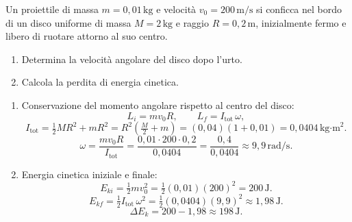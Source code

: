 \begin{question}[ID=3.3, subtitle={Proiettile che si conficca nel bordo di un disco rotante}, tags={urti anelastici, momento angolare}, difficulty=difficile]
Un proiettile di massa \(m = 0{,}01 \, \text{kg}\) e velocità \(v_0 = 200 \, \text{m/s}\) si conficca nel bordo di un disco uniforme di massa \(M = 2 \, \text{kg}\) e raggio \(R = 0{,}2 \, \text{m}\), inizialmente fermo e libero di ruotare attorno al suo centro.
\begin{enumerate}
    \item Determina la velocità angolare del disco dopo l'urto.
    \item Calcola la perdita di energia cinetica.
\end{enumerate}
\begin{solution}
    \begin{enumerate}
        \item Conservazione del momento angolare rispetto al centro del disco:
        \[
            L_i = m v_0 R, \qquad L_f = I_{\text{tot}}\,\omega,
        \]
        \[
            I_{\text{tot}} = \tfrac{1}{2}MR^2 + mR^2 = R^2\!\left(\tfrac{M}{2} + m\right) = (0{,}04)\left(1 + 0{,}01\right) = 0{,}0404 \, \text{kg·m}^2.
        \]
        \[
            \omega = \frac{m v_0 R}{I_{\text{tot}}} = \frac{0{,}01 \cdot 200 \cdot 0{,}2}{0{,}0404} = \frac{0{,}4}{0{,}0404} \approx 9{,}9 \, \text{rad/s}.
        \]
        \item Energia cinetica iniziale e finale:
        \[
            E_{ki} = \tfrac{1}{2}m v_0^2 = \tfrac{1}{2}(0{,}01)(200)^2 = 200 \, \text{J}.
        \]
        \[
            E_{kf} = \tfrac{1}{2} I_{\text{tot}}\,\omega^2 = \tfrac{1}{2}(0{,}0404)(9{,}9)^2 \approx 1{,}98 \, \text{J}.
        \]
        \[
            \Delta E_k = 200 - 1{,}98 \approx 198 \, \text{J}.
        \]
    \end{enumerate}
\end{solution}
\end{question}


